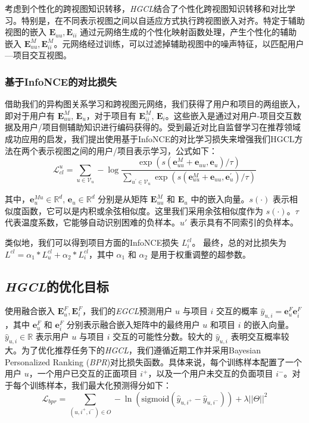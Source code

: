 \documentclass{article}
\begin{document}
考虑到个性化的跨视图知识转移，\emph{HGCL}结合了个性化跨视图知识转移和对比学习。特别是，在不同表示视图之间以自适应方式执行跨视图嵌入对齐。特定于辅助视图的嵌入 \( \mathbf{E}_{uu}, \mathbf{E}_{ii} \) 通过元网络生成的个性化映射函数处理，产生个性化的辅助嵌入 \( \mathbf{E}^M_{uu}, \mathbf{E}^M_{ii} \)。元网络经过训练，可以过滤掉辅助视图中的噪声特征，以匹配用户—项目交互视图。

\subsubsection{基于InfoNCE的对比损失}

借助我们的异构图关系学习和跨视图元网络，我们获得了用户和项目的两组嵌入，即对于用户有 $\mathbf{E}^{M}_{uu}$, $\mathbf{E}_u$，对于项目有 $\mathbf{E}^{M}_{ii}$, $\mathbf{E}_i$。这些嵌入是通过对用户-项目交互数据及用户/项目侧辅助知识进行编码获得的。受到最近对比自监督学习在推荐领域成功应用的启发\cite{Wu_2021}\cite{Xia_2022}，我们提出使用基于InfoNCE的对比学习损失来增强我们HGCL方法在两个表示视图之间的用户/项目表示学习，公式如下：
\begin{equation}
\mathcal{L}_{cl}^u=\sum_{u\in\mathcal{V}_u}-\log\frac{\exp\left(s(\mathbf{e}_{uu}^M+\mathbf{e}_{uu},\mathbf{e}_u)/\tau\right)}{\sum_{u^{\prime}\in\mathcal{V}_u}\exp\left(s(\mathbf{e}_{uu}^M+\mathbf{e}_{uu},\mathbf{e}_u^{\prime})/\tau\right)}
\end{equation}

其中，$\mathbf{e}^{Mu}_{u} \in \mathbb{R}^d$, $\mathbf{e}_u \in \mathbb{R}^d$ 分别是从矩阵 $\mathbf{E}^{M}_{uu}$ 和 $\mathbf{E}_u$ 中的嵌入向量。$s(\cdot)$ 表示相似度函数，它可以是内积或余弦相似度。这里我们采用余弦相似度作为 $s(\cdot)$。$\tau$ 代表温度系数，它能够自动识别困难的负样本。$u'$ 表示具有不同索引的负样本。

类似地，我们可以得到项目方面的InfoNCE损失 $L^{cl}_i$。
最终，总的对比损失为 $L^{cl} = \alpha_1 * L^{cl}_u + \alpha_2 * L^{cl}_i$，其中 $\alpha_1$ 和 $\alpha_2$ 是用于权重调整的超参数。

\subsection{\emph{HGCL}的优化目标}

使用融合嵌入 \( \mathbf{E}^F_u, \mathbf{E}^F_i \)，我们的\emph{EGCL}预测用户 \( u \) 与项目 \( i \) 交互的概率 \( \hat{y}_{u,i} = \mathbf{e}^F_u \mathbf{e}^F_i \)，其中 \( \mathbf{e}^F_u \) 和 \( \mathbf{e}^F_i \) 分别表示融合嵌入矩阵中的最终用户 \( u \) 和项目 \( i \) 的嵌入向量。\( \hat{y}_{u,i} \in \mathbb{R} \) 表示用户 \( u \) 与项目 \( i \) 交互的可能性分数。较大的 \( \hat{y}_{u,i} \) 表明交互概率较大。为了优化推荐任务下的\emph{HGCL}，我们遵循近期工作并采用Bayesian Personalized Ranking (\emph{BPR})\cite{rendle2012bprbayesianpersonalizedranking}对比损失函数。具体来说，每个训练样本配置了一个用户 \( u \)，一个用户已交互的正面项目 \( i^+ \)，以及一个用户未交互的负面项目 \( i^- \)。对于每个训练样本，我们最大化预测得分如下：
\begin{equation}
\mathcal{L}_{bpr}=\sum_{(u,i^+,i^-)\in O}-\ln(\mathrm{sigmoid}(\hat{y}_{u,i^+}-\hat{y}_{u,i^-}))+\lambda||\Theta||^2
\end{equation}
\end{document}
